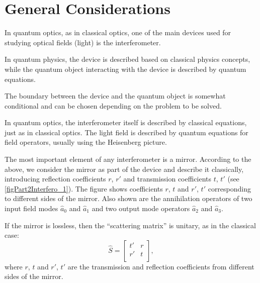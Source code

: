 \section{General Considerations}
In quantum optics, as in classical optics, one of the main devices used for studying optical fields (light) is the interferometer.

In quantum physics, the device is described based on classical physics concepts, while the quantum object interacting with the device is described by quantum equations.

The boundary between the device and the quantum object is somewhat conditional and can be chosen depending on the problem to be solved.

In quantum optics, the interferometer itself is described by classical equations, just as in classical optics. The light field is described by quantum equations for field operators, usually using the Heisenberg picture.

The most important element of any interferometer is a mirror. According to the above, we consider the mirror as part of the device and describe it classically, introducing reflection coefficients $r$, $r'$ and transmission coefficients $t$, $t'$ (see \autoref{figPart2Interfero_1}). The figure shows coefficients $r$, $t$ and $r'$, $t'$ corresponding to different sides of the mirror. Also shown are the annihilation operators of two input field modes $\hat{a}_0$ and $\hat{a}_1$ and two output mode operators $\hat{a}_2$ and $\hat{a}_3$.



If the mirror is lossless, then the ``scattering matrix'' is unitary, as in the classical case:
\[
\hat{S} = 
\begin{bmatrix}
t' & r \\
r' & t \\
\end{bmatrix},
\]
where $r$, $t$ and $r'$, $t'$ are the transmission and reflection coefficients from different sides of the mirror.

